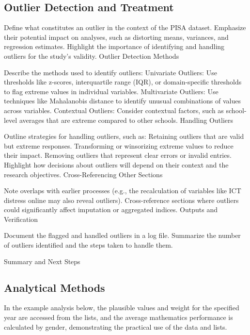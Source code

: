 \documentclass[
]{article}
\begin{document}
\hypertarget{outlier-detection-and-treatment}{%
\subsection{Outlier Detection and
Treatment}\label{outlier-detection-and-treatment}}

Define what constitutes an outlier in the context of the PISA dataset.
Emphasize their potential impact on analyses, such as distorting means,
variances, and regression estimates. Highlight the importance of
identifying and handling outliers for the study's validity. Outlier
Detection Methods

Describe the methods used to identify outliers: Univariate Outliers: Use
thresholds like z-scores, interquartile range (IQR), or domain-specific
thresholds to flag extreme values in individual variables. Multivariate
Outliers: Use techniques like Mahalanobis distance to identify unusual
combinations of values across variables. Contextual Outliers: Consider
contextual factors, such as school-level averages that are extreme
compared to other schools. Handling Outliers

Outline strategies for handling outliers, such as: Retaining outliers
that are valid but extreme responses. Transforming or winsorizing
extreme values to reduce their impact. Removing outliers that represent
clear errors or invalid entries. Highlight how decisions about outliers
will depend on their context and the research objectives.
Cross-Referencing Other Sections

Note overlaps with earlier processes (e.g., the recalculation of
variables like ICT distress online may also reveal outliers).
Cross-reference sections where outliers could significantly affect
imputation or aggregated indices. Outputs and Verification

Document the flagged and handled outliers in a log file. Summarize the
number of outliers identified and the steps taken to handle them.

Summary and Next Steps

\hypertarget{analytical-methods}{%
\subsection{Analytical Methods}\label{analytical-methods}}

In the example analysis below, the plausible values and weight for the
specified year are accessed from the lists, and the average mathematics
performance is calculated by gender, demonstrating the practical use of
the data and lists.
\end{document}
